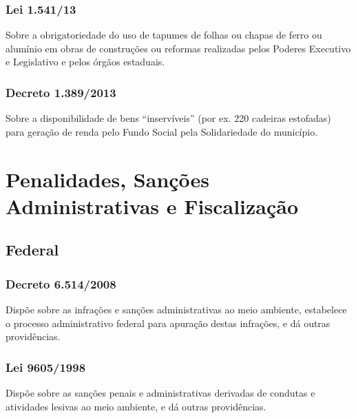 \begin{subapend}
\begin{subsubapend}
		\subsubsection{Lei 1.541/13}
		Sobre a obrigatoriedade do uso de tapumes de folhas ou chapas de ferro ou alumínio em obras de construções ou reformas realizadas pelos Poderes Executivo e Legislativo e pelos órgãos estaduais.
		\subsubsection{Decreto 1.389/2013}
		Sobre a disponibilidade de bens “inservíveis” (por ex. 220 cadeiras estofadas) para geração de renda pelo Fundo Social pela Solidariedade do município.
	\end{subsubapend}
\end{subapend}



\section{Penalidades, Sanções Administrativas e Fiscalização}

\begin{subapend}
	\subsection{Federal}
	\begin{subsubapend}
		\item \subsubsection{Decreto 6.514/2008}
		Dispõe sobre as infrações e sanções administrativas ao meio ambiente, estabelece o processo administrativo federal para apuração destas infrações, e dá outras providências.
		\subsubsection{Lei 9605/1998}
		Dispõe sobre as sanções penais e administrativas derivadas de condutas e atividades lesivas ao meio ambiente, e dá outras providências.
	\end{subsubapend}
\end{subapend}



